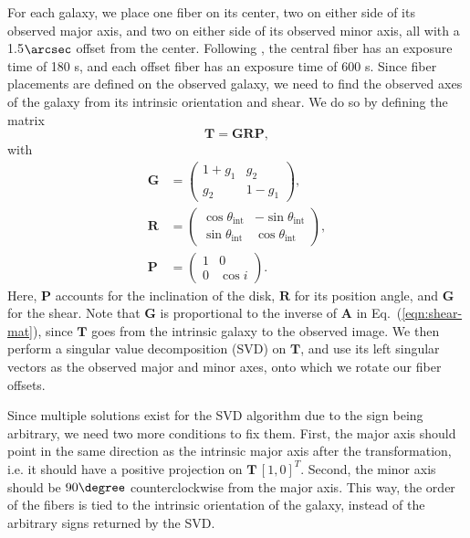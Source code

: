For each galaxy, we place one fiber on its center, two on either side of its observed major axis, and two on either side of its observed minor axis, all with a 1.5$\arcsec$ offset from the center. Following \citep{KLDESI}, the central fiber has an exposure time of 180 s, and each offset fiber has an exposure time of 600 s. Since fiber placements are defined on the observed galaxy, we need to find the observed axes of the galaxy from its intrinsic orientation and shear. We do so by defining the matrix
\begin{equation}
\label{eqn:fiber-transform}
    \mathbf{T} = \mathbf{G}\mathbf{R}\mathbf{P},
\end{equation}
with
\begin{equation}
\label{eqn:fiber-matrices}
    \begin{aligned}
    \mathbf{G} &= \begin{pmatrix}
    1+g_1 & g_2 \\
    g_2 & 1-g_1
    \end{pmatrix}, \\
    \mathbf{R} &= \begin{pmatrix}
    \cos\theta_\mathrm{int} & -\sin\theta_\mathrm{int} \\
    \sin\theta_\mathrm{int} & \cos\theta_\mathrm{int}
    \end{pmatrix}, \\
    \mathbf{P} &= \begin{pmatrix}
    1 & 0 \\
    0 & \cos i
    \end{pmatrix}.
    \end{aligned}
\end{equation}
Here, $\mathbf{P}$ accounts for the inclination of the disk, $\mathbf{R}$ for its position angle, and $\mathbf{G}$ for the shear. Note that $\mathbf{G}$ is proportional to the inverse of $\mathbf{A}$ in Eq.~(\ref{eqn:shear-mat}), since $\mathbf{T}$ goes from the intrinsic galaxy to the observed image. We then perform a singular value decomposition (SVD) on $\mathbf{T}$, and use its left singular vectors as the observed major and minor axes, onto which we rotate our fiber offsets.

Since multiple solutions exist for the SVD algorithm due to the sign being arbitrary, we need two more conditions to fix them. First, the major axis should point in the same direction as the intrinsic major axis after the transformation, i.e. it should have a positive projection on $\mathbf{T}\,[1, 0]^T$. Second, the minor axis should be $90\degree$ counterclockwise from the major axis. This way, the order of the fibers is tied to the intrinsic orientation of the galaxy, instead of the arbitrary signs returned by the SVD.

